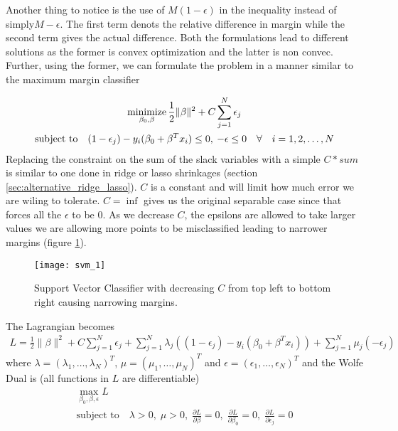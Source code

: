 \documentclass[../statistical_learning_notes.tex]{subfiles}
\begin{document}
    Another thing to notice is the use of $M(1-\epsilon)$ in the inequality instead of simply$M - \epsilon$. The first term denots the relative difference in margin while the second term gives the actual difference. Both the formulations lead to different solutions as the former is convex optimization and the latter is non convec. Further, using the former, we can formulate the problem in a manner similar to the maximum margin classifier

    \begin{gather*}
        \operatorname*{minimize}_{\beta_{0}, \beta}  \frac{1}{2}\lVert \beta \rVert^{2} + C\sum_{j=1}^{N}\epsilon_{j}\\
        \text{subject to} \quad (1-\epsilon_{j}) - y_{i}(\beta_{0} + \beta^{T}x_{i}) \leq 0, \: -\epsilon \leq 0 \quad \forall \quad i = 1, 2, \ldots, N\\
    \end{gather*}
    Replacing the constraint on the sum of the slack variables with a simple $C * sum$ is similar to one done in ridge or lasso shrinkages (section \ref{sec:alternative_ridge_lasso}). $C$ is a constant and will limit how much error we are wiling to tolerate. $C = \inf$ gives us the original separable case since that forces all the $\epsilon$ to be $0$. As we decrease $C$, the epsilons are allowed to take larger values we are allowing more points to be misclassified leading to narrower margins (figure \ref{fig:svm_1}).\newline

    \begin{figure}[h]
    \texttt{[image: svm\_1]}
    \centering
    \caption{Support Vector Classifier with decreasing $C$ from top left to bottom right causing narrowing margins.}
    \label{fig:svm_1} %
    \end{figure}

    The Lagrangian becomes
    \begin{gather*}
        L = \frac{1}{2}\lVert \beta \rVert^{2} + C\sum_{j=1}^{N}\epsilon_{j} + \sum_{j=1}^{N} \lambda_{j}((1-\epsilon_{j}) - y_{i}(\beta_{0} + \beta^{T}x_{i})) + \sum_{j=1}^{N} \mu_{j}(-\epsilon_{j})
    \end{gather*}
    where $\lambda = (\lambda_{1}, \ldots, \lambda_{N})^{T}$, $\mu = (\mu_{1}, \ldots, \mu_{N})^{T}$ and $\epsilon = (\epsilon_{1}, \ldots, \epsilon_{N})^{T}$ and the Wolfe Dual is (all functions in $L$ are differentiable)
    \begin{gather*}
        \max_{\beta_{0}, \beta, \epsilon} L\\
        \text{subject to} \quad \lambda > 0, \; \mu>0, \; \frac{\partial L}{\partial \beta} = 0, \; \frac{\partial L}{\partial \beta_{0}} = 0, \; \frac{\partial L}{\partial \epsilon_{j}} = 0
    \end{gather*}
\end{document}
